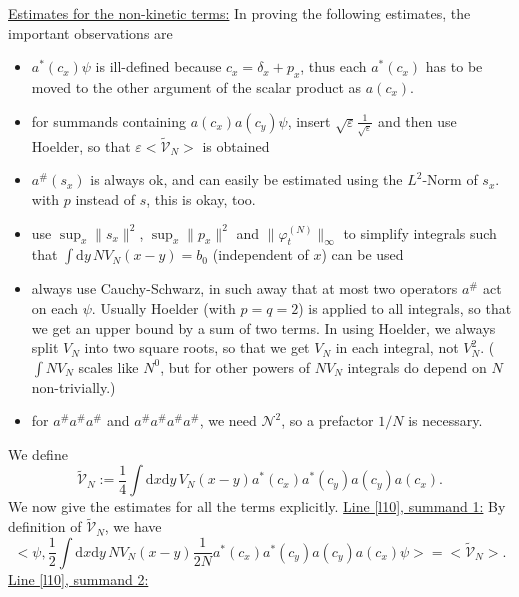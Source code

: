 \documentclass[11pt,a4paper]{scrartcl}
\newcommand{\di}{\textrm{d}}		%
\newcommand{\Ncal}{\mathcal{N}}		%
\newcommand{\tilV}{\tilde{\mathcal{V}}_N}		%
\newcommand{\estlist}[2]{\underline{Line \ref{l#1}, summand #2:}}
\newcommand{\scal}[2]{\big<#1,#2\big>} %
\newcommand{\norm}[1]{\lVert#1\rVert}	%
\newcommand{\ev}[1]{\big<#1\big>}	%
\newcommand{\ph}{\varphi_t^{(N)}}	%
\newcommand{\bd}{\begin{displaymath}}			%
\newcommand{\ed}{\end{displaymath}}
\begin{document}
\underline{Estimates for the non-kinetic terms:}\newline
In proving the following estimates, the important observations are
\begin{itemize}
 \item $a^*(c_x)\psi$ is ill-defined because $c_x = \delta_x + p_x$, thus each $a^\ast(c_x)$ has to be moved to the other argument of the scalar product as $a(c_x)$.
 \item for summands containing $a(c_x) a(c_y) \psi$, insert $\sqrt{\varepsilon} \frac{1}{\sqrt{\varepsilon}}$ and then use Hoelder, so that $\varepsilon\ev{\tilV}$ is obtained
 \item $a^\#(s_x)$ is always ok, and can easily be estimated using the $L^2$-Norm of $s_x$. with $p$ instead of $s$, this is okay, too.
 \item use $\sup_x \norm{s_x}^2$, $\sup_x \norm{p_x}^2$ and $\norm{\ph}_\infty$ to simplify integrals such that $\int \di y\, NV_N(x-y) = b_0$ (independent of $x$) can be used
\item always use Cauchy-Schwarz, in such away that at most two operators $a^\#$ act on each $\psi$. Usually Hoelder (with $p=q=2$) is applied to all integrals, so that we get an upper bound by a sum of two terms. In using Hoelder, we always split $V_N$ into two square roots, so that we get $V_N$ in each integral, not $V_N^2$. ($\int N V_N$ scales like $N^0$, but for other powers of $N V_N$ integrals do depend on $N$ non-trivially.)
\item for $a^\# a^\# a^\#$ and $a^\# a^\# a^\# a^\#$, we need $\Ncal^2$, so a prefactor $1/N$ is necessary. 
\end{itemize}
We define
\bd
\tilV := \frac{1}{4} \int \di x\di y\, V_N(x-y) a^\ast(c_x) a^\ast(c_y)a(c_y)a(c_x).
\ed
We now give the estimates for all the terms explicitly.
\newline\estlist{10}{1}
By definition of $\tilV$, we have
\bd
\scal{\psi}{\frac{1}{2}\int \di x\di y\, NV_N(x-y)\frac{1}{2N} a^\ast(c_x) a^\ast(c_y) a(c_y) a(c_x)\psi} = \ev{\tilV}.
\ed
\estlist{10}{2}
\end{document}
